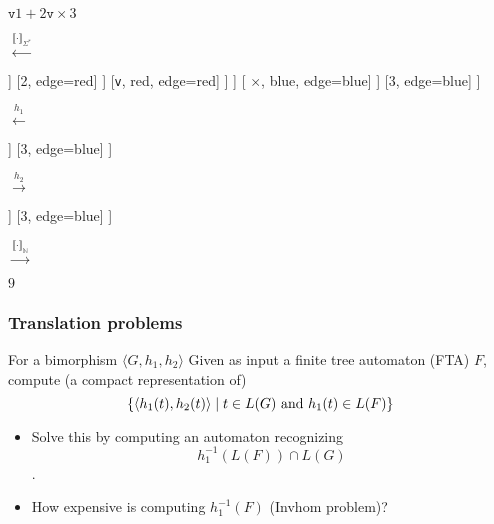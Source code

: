 \documentclass{beamer}
\begin{document}
\begin{frame}
\begin{center}
      \fontsize{6}{7}      
      \begin{minipage}{0.1\linewidth}
        $\texttt{v} 1 + 2\texttt{v} \times 3$
      \end{minipage}
    $\xleftarrow{\llbracket \cdot \rrbracket_{\Sigma^{\ast}}}$
    \begin{minipage}{0.18\linewidth}
	      \centering
	      \begin{forest}
      	      [$\cdot$, blue [$\cdot$, blue, edge=blue [ $\cdot$, red, edge=blue [ \texttt{v}, red, edge=red ] [$\cdot$, red, edge=red [$\cdot$, red, edge=red [$\cdot$, red, edge=red [1, edge=red] [+, red, edge=red]] [2, edge=red] ] [\texttt{v}, red, edge=red] ]  ] [ $\times$, blue, edge=blue] ] [3, edge=blue] ]
           \end{forest}
      \end{minipage}
      $\xleftarrow{h_1}$      
	  \begin{minipage}{0.1\linewidth}
		  \centering
		  \begin{forest}
		    [$r_{m}$, blue [ $r_{a}$, red, edge=blue [$1$, edge=red] [$2$, edge=red] ] [$3$, edge=blue] ] 
		  \end{forest}
	  \end{minipage}
      $\xrightarrow{h_2}$
      \begin{minipage}{0.18\linewidth}
      	\centering
      	\begin{forest}
      		[\texttt{mul}, blue [ \texttt{add},red, edge=blue [$1$, edge=red] [$2$, edge=red] ]  [$3$, edge=blue] ]
      	\end{forest}
      \end{minipage}
      $\xrightarrow{\llbracket \cdot \rrbracket_{\mathbb{N}}}$
      \begin{minipage}{0.05\linewidth}
      	\centering
      	$9$
      \end{minipage}
    \end{center}
\end{frame}

\begin{frame}
  \frametitle{Translation problems}

  \begin{block}{For a bimorphism $\langle G, h_1, h_2 \rangle$}
    Given as input a finite tree automaton (FTA) $F$, compute (a compact representation of)
    \[ \{ \langle h_1(t), h_2(t) \rangle \mid t \in L(G) \textnormal{ and } h_1(t) \in L(F) \} \]
  \end{block}
  \begin{itemize}
  \item Solve this by computing an automaton recognizing \[h_1^{-1}(L(F)) \cap L(G)\].
  \item \alert{How expensive is computing $h_1^{-1}(F)$ (Invhom problem)?}
  \end{itemize}
\end{frame}
\end{document}
